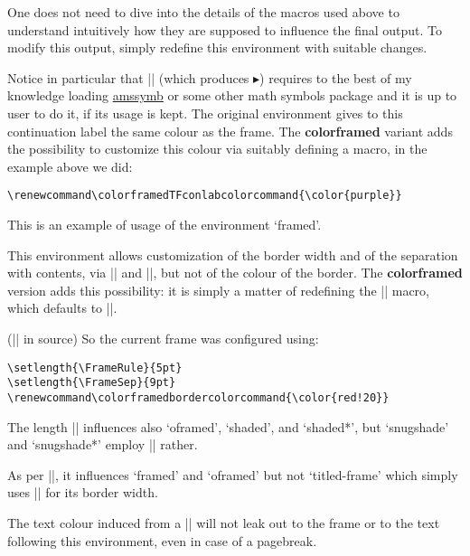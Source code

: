 \documentclass[a4paper,dvipdfmx,11pt]{article}
\def\colorframedTFconlabcolorcommand{\color{purple}}
\def\colorframedbordercolorcommand{\color{red!20}}
\def\ctanpackage#1{\href{https://ctan.org/pkg/#1}{#1}}
\newcommand\colorframed{%
        \texorpdfstring{{\color{joli}\bfseries colorframed}}{colorframed}\xspace}
\begin{document}
\begin{snugshade*}
\leavevmode\color{ForestGreen}
  One does not need to dive into the details of the macros
  used above to understand intuitively how they are supposed
  to influence the final output.  To modify this output,
  simply redefine this environment with suitable changes.

  Notice in particular that |\blacktriangleright|
  (which produces $\blacktriangleright$) requires to
  the best of my knowledge loading \ctanpackage{amssymb} or
  some other math symbols package and it is up to user to do it, if
  its usage is kept.
%
  The original environment gives to this continuation label the
  same colour as the frame.  The \colorframed variant adds the
  possibility to customize this colour via suitably defining a
  macro, in the example above we did:
\begin{verbatim}
\renewcommand\colorframedTFconlabcolorcommand{\color{purple}}
\end{verbatim}
\end{snugshade*}

\begin{framed}
  This is an example of usage of the environment `framed'.

  This environment allows customization of the border width
  and of the separation with contents, via |\FrameRule| and
  |\FrameSep|, but not of the colour of the border.  The
  \colorframed version adds this possibility: it is simply a
  matter of redefining the |\colorframedbordercolorcommand|
  macro, which defaults to |\normalcolor|.

\footnotesize (|\color{blue}| in source)
\normalsize
\color{blue}
  So the current frame was configured using:
\begin{verbatim}
\setlength{\FrameRule}{5pt}
\setlength{\FrameSep}{9pt}
\renewcommand\colorframedbordercolorcommand{\color{red!20}}
\end{verbatim}
\begin{footnotesize}\normalcolor
  The length |\FrameSep| influences also `oframed', `shaded', and `shaded*',
  but `snugshade' and `snugshade*' employ |\fboxsep| rather.

  As per |\FrameRule|, it influences `framed' and `oframed' but not
  `titled-frame' which simply uses |\fboxrule| for its border width.\par
\end{footnotesize}
  The text colour induced from a |\color{blue}|
  will not leak out to the frame or to the text following this
  environment, even in case of a pagebreak.
\end{framed}
\end{document}
